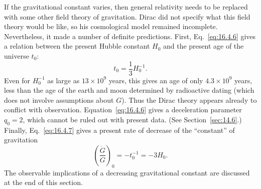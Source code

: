 If the gravitational constant varies, then general relativity needs to be
replaced with some other field theory of gravitation. Dirac did not specify what
this field theory would be like, so his cosmological model remained incomplete.
Nevertheless, it made a number of definite predictions. First,
Eq.~\eqref{eq:16.4.6} gives a relation between the present Hubble constant
\(H_0\) and the present age of the universe \(t_0\):
\begin{equation}
  t_0=\frac13H_0^{-1}.
  \tag{16.4.8}\label{eq:16.4.8}
\end{equation}
Even for \(H_0^{-1}\) as large as \(13\times10^9\) years, this gives an age
of only \(4.3\times10^9\) years, less than the age of the earth and moon
determined by radioactive dating (which does not involve assumptions about
\(G\)). Thus the Dirac theory appears already to conflict with observation.
Equation~\eqref{eq:16.4.6} gives a deceleration parameter \(q_0=2\), which
cannot be ruled out with present data. (See Section~\ref{sec:14.6}.) Finally,
Eq.~\eqref{eq:16.4.7} gives a present rate of decrease of the ``constant'' of
gravitation
\begin{equation}
  \left(\frac{\dot G}{G}\right)_0
  =
  -t_0^{-1}
  =
  -3H_0.
  \tag{16.4.9}\label{eq:16.4.9}
\end{equation}
The observable implications of a decreasing gravitational constant are
discussed at the end of this section.

